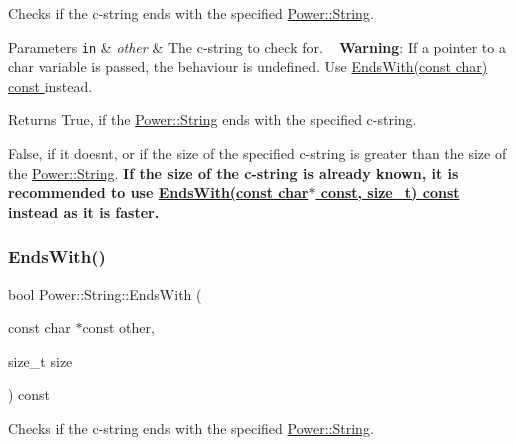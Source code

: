 Checks if the c-\/string ends with the specified \hyperlink{class_power_1_1_string}{Power\+::\+String}. 


\begin{DoxyParams}[1]{Parameters}
\mbox{\tt in}  & {\em other} & The c-\/string to check for. ~\newline
 {\bfseries Warning}\+: If a pointer to a char variable is passed, the behaviour is undefined. Use \hyperlink{class_power_1_1_string_a8f4b32bad7099116f14259d2bd0c4004}{Ends\+With(const char) const }instead. \\
\hline
\end{DoxyParams}
\begin{DoxyReturn}{Returns}
True, if the \hyperlink{class_power_1_1_string}{Power\+::\+String} ends with the specified c-\/string. 

False, if it doesn\textquotesingle{}t, or if the size of the specified c-\/string is greater than the size of the \hyperlink{class_power_1_1_string}{Power\+::\+String}.  {\bfseries If the size of the c-\/string is already known, it is recommended to use \hyperlink{class_power_1_1_string_ad265a1ae695573549f1c2046a342ca27}{Ends\+With(const char$\ast$ const, size\+\_\+t) const }instead as it is faster.} 
\end{DoxyReturn}
\mbox{\label{class_power_1_1_string_ad265a1ae695573549f1c2046a342ca27}} 
\subsubsection{\texorpdfstring{Ends\+With()}{EndsWith()}\hspace{0.1cm}{\footnotesize\ttfamily [3/4]}}
{\footnotesize\ttfamily bool Power\+::\+String\+::\+Ends\+With (\begin{DoxyParamCaption}\item[{const char $\ast$const}]{other,  }\item[{size\+\_\+t}]{size }\end{DoxyParamCaption}) const\hspace{0.3cm}{\ttfamily [inline]}}



Checks if the c-\/string ends with the specified \hyperlink{class_power_1_1_string}{Power\+::\+String}. 


